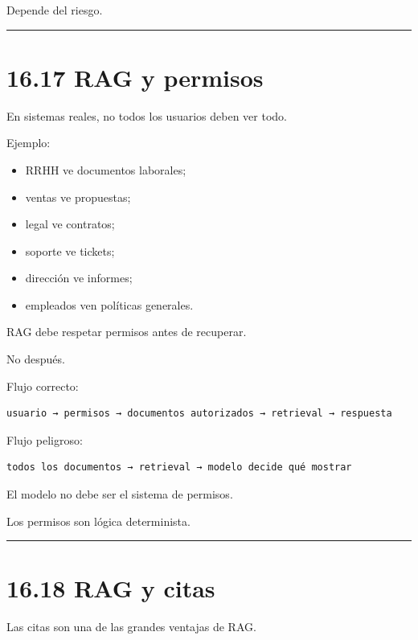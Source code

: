 Depende del riesgo.

\begin{center}\rule{0.5\linewidth}{0.5pt}\end{center}

\section{16.17 RAG y permisos}\label{rag-y-permisos}

En sistemas reales, no todos los usuarios deben ver todo.

Ejemplo:

\begin{itemize}
\tightlist
\item
  RRHH ve documentos laborales;
\item
  ventas ve propuestas;
\item
  legal ve contratos;
\item
  soporte ve tickets;
\item
  dirección ve informes;
\item
  empleados ven políticas generales.
\end{itemize}

RAG debe respetar permisos antes de recuperar.

No después.

Flujo correcto:

\begin{lstlisting}
usuario → permisos → documentos autorizados → retrieval → respuesta
\end{lstlisting}

Flujo peligroso:

\begin{lstlisting}
todos los documentos → retrieval → modelo decide qué mostrar
\end{lstlisting}

El modelo no debe ser el sistema de permisos.

Los permisos son lógica determinista.

\begin{center}\rule{0.5\linewidth}{0.5pt}\end{center}

\section{16.18 RAG y citas}\label{rag-y-citas}

Las citas son una de las grandes ventajas de RAG.

